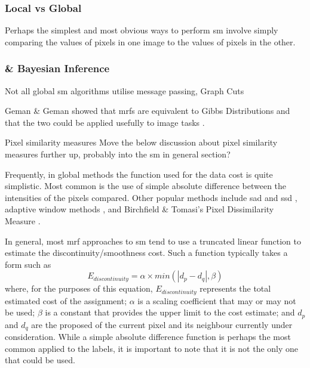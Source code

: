 \subsubsection{Local vs Global}

Perhaps the simplest and most obvious ways to perform \gls{sm} involve simply comparing the values of pixels in one image to the values of pixels in the other.

\subsubsection{ \& Bayesian Inference}

Not all global \gls{sm} algorithms utilise message passing, \eg{} Graph Cuts \cite{Kolmogorov2001,Tappen2003}

Geman \& Geman \cite{Geman1984} showed that \glspl{mrf} are equivalent to Gibbs Distributions and that the two could be applied usefully to image tasks \cite{Gimelfarb1999}.

\begin{anfxwarning}{Pixel similarity measures}
    Move the below discussion about pixel similarity measures further up, probably into the \gls{sm} in general section?
\end{anfxwarning}

Frequently, in global methods the function used for the data cost is quite simplistic.  Most common is the use of simple absolute difference between the intensities of the pixels compared.  Other popular methods include \gls{sad} and \gls{ssd} \fxerror[inline]{[ref]}, adaptive window methods \cite{Yoon2005,Yoon2006}, and Birchfield \& Tomasi's Pixel Dissimilarity Measure \cite{Birchfield1998}.

In general, most \gls{mrf} approaches to \gls{sm} tend to use a truncated linear function to estimate the discontinuity/smoothness cost.  Such a function typically takes a form such as \[ E_{discontinuity} = \alpha \times min(| d_p - d_q |, \beta) \] where, for the purposes of this equation, \(E_{discontinuity}\) represents the total estimated cost of the assignment; \(\alpha\) is a scaling coefficient that may or may not be used; \(\beta\) is a constant that provides the upper limit to the cost estimate; and \(d_p\) and \(d_q\) are the proposed  of the current pixel and its neighbour currently under consideration.  While a simple absolute difference function is perhaps the most common applied to the labels, it is important to note that it is not the only one that could be used.  


